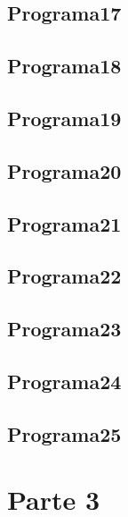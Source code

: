 \documentclass{article}
\begin{document}
\subsection{Programa17}

\newpage

\subsection{Programa18}

\newpage

\subsection{Programa19}

\newpage

\subsection{Programa20}

\newpage

\subsection{Programa21}

\newpage

\subsection{Programa22}

\newpage

\subsection{Programa23}

\newpage

\subsection{Programa24}

\newpage

\subsection{Programa25}

\newpage

\section{Parte 3}
\end{document}
